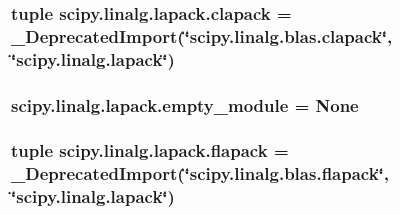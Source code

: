 \subsubsection[{clapack}]{\setlength{\rightskip}{0pt plus 5cm}tuple scipy.\+linalg.\+lapack.\+clapack = \+\_\+\+Deprecated\+Import(\char`\"{}scipy.\+linalg.\+blas.\+clapack\char`\"{}, \char`\"{}scipy.\+linalg.\+lapack\char`\"{})}\label{namespacescipy_1_1linalg_1_1lapack_ab8070c754e34b5dfbe3a165fca04aaa5}
\hypertarget{namespacescipy_1_1linalg_1_1lapack_a5b72961ae6843f5436cf4f37948b0ea7}{}
\subsubsection[{empty\+\_\+module}]{\setlength{\rightskip}{0pt plus 5cm}scipy.\+linalg.\+lapack.\+empty\+\_\+module = None}\label{namespacescipy_1_1linalg_1_1lapack_a5b72961ae6843f5436cf4f37948b0ea7}
\hypertarget{namespacescipy_1_1linalg_1_1lapack_aaf4f8c5ac0a012a57442b865620a4218}{}
\subsubsection[{flapack}]{\setlength{\rightskip}{0pt plus 5cm}tuple scipy.\+linalg.\+lapack.\+flapack = \+\_\+\+Deprecated\+Import(\char`\"{}scipy.\+linalg.\+blas.\+flapack\char`\"{}, \char`\"{}scipy.\+linalg.\+lapack\char`\"{})}\label{namespacescipy_1_1linalg_1_1lapack_aaf4f8c5ac0a012a57442b865620a4218}
